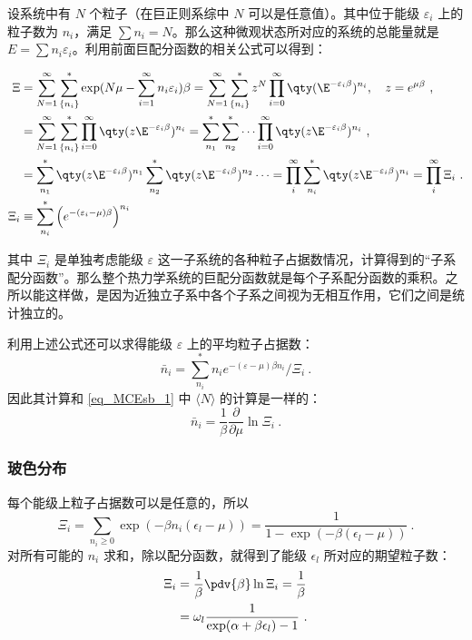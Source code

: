 设系统中有 $N$ 个粒子（在巨正则系综中 $N$ 可以是任意值）。其中位于能级 $\varepsilon_i$ 上的粒子数为 $n_i$，满足 $\sum n_i=N$。那么这种微观状态所对应的系统的总能量就是 $E=\sum n_i \varepsilon_i$。利用前面巨配分函数的相关公式可以得到：

\begin{equation}
\begin{aligned}
\Xi & = \sum_{N=1}^\infty  \sum_{\{n_i\}}^*  \exp(N\mu  - \sum_{i=1}^\infty n_i \varepsilon_i)\beta
= \sum_{N=1}^\infty  \sum_{\{n_i\}}^* z^N \prod_{i=0}^\infty \qty(\E^{-\varepsilon_i\beta})^{n_i}
,\quad z=e^{\mu\beta}~,
\\
&= \sum_{N=1}^\infty \sum_{\{n_i\}}^* \prod_{i=0}^\infty \qty(z \E^{-\varepsilon_i \beta})^{n_i}
= \sum_{n_1}^* \sum_{n_2}^* \dots \prod_{i=0}^\infty \qty(z \E^{-\varepsilon_i \beta})^{n_i}
~,
\\
&= \sum_{n_1}^* \qty(z \E^{-\varepsilon_i\beta})^{n_1} \sum_{n_2}^* \qty(z \E^{ -\varepsilon_i\beta})^{n_2}\dots
= \prod_i^\infty \sum_{n_i}^* \qty(z \E^{-\varepsilon_i \beta })^{n_i}=\prod_i^\infty \Xi_i~.\\
\Xi_i&\equiv \sum_{n_i}^* \left(e^{-(\varepsilon_i-\mu)\beta}\right)^{n_i}
\end{aligned}
\end{equation}

其中 $\Xi_i$ 是单独考虑能级 $\varepsilon$ 这一子系统的各种粒子占据数情况，计算得到的“子系配分函数”。那么整个热力学系统的巨配分函数就是每个子系配分函数的乘积。之所以能这样做，是因为近独立子系中各个子系之间视为无相互作用，它们之间是统计独立的。

利用上述公式还可以求得能级 $\varepsilon$ 上的平均粒子占据数：
\begin{equation}
\bar n_i = \sum_{n_i}^* n_i e^{-(\varepsilon-\mu)\beta n_i}/\Xi_i~.
\end{equation}
因此其计算和 \autoref{eq_MCEsb_1} 中 $\langle N\rangle$ 的计算是一样的：
\begin{equation}
\bar n_i = \frac{1}{\beta} \frac{\partial}{\partial \mu}\ln \Xi_i~.
\end{equation}
\subsubsection{玻色分布}
每个能级上粒子占据数可以是任意的，所以
\begin{equation}
\Xi_i=\sum_{n_i\ge 0} \exp(-\beta n_i(\epsilon_l-\mu))=\frac{1}{1-\exp(-\beta(\epsilon_l-\mu))}~.
\end{equation}
对所有可能的 $n_i$ 求和，除以配分函数，就得到了能级 $\epsilon_l$ 所对应的期望粒子数：
\begin{equation}
\begin{aligned}
\Xi_i&=\frac{1}{\beta}\pdv{\beta} \ln \Xi_i = \frac{1}{\beta} \\\
&=\omega_l \frac{1}{\exp(\alpha+\beta\epsilon_l)-1}~.
\end{aligned}
\end{equation}
